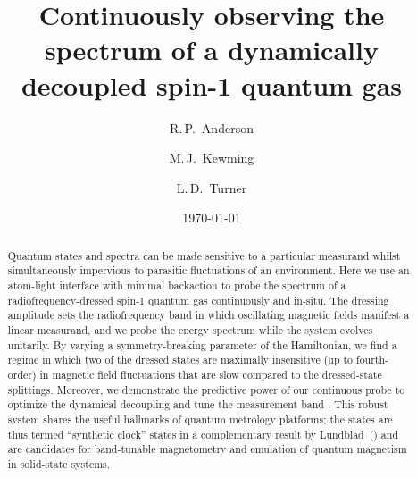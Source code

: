 \documentclass[aps,prl,reprint,superscriptaddress,floatfix]{revtex4-1}
\begin{document}
\title{Continuously observing the spectrum of a dynamically decoupled spin-1 quantum gas}

\author{R.\,P.~Anderson}
\author{M.\,J.~Kewming }
\author{L.\,D.~Turner}

\date{\today}

\begin{abstract}
Quantum states and spectra can be made sensitive to a particular measurand whilst simultaneously impervious to parasitic fluctuations of an environment.
Here we use an atom-light interface with minimal backaction to probe the spectrum of a radiofrequency-dressed spin-1 quantum gas continuously and in-situ.
The dressing amplitude sets the radiofrequency band in which oscillating magnetic fields manifest a linear measurand, and we probe the energy spectrum while the system evolves unitarily.
By varying a symmetry-breaking parameter of the Hamiltonian, we find a regime in which two of the dressed states are maximally insensitive (up to fourth-order) in magnetic field fluctuations that are slow compared to the dressed-state splittings.
Moreover, we demonstrate the predictive power of our continuous probe to optimize the dynamical decoupling and tune the measurement band .
This robust system shares the useful hallmarks of quantum metrology platforms; the states are thus termed ``synthetic clock'' states in a complementary result by Lundblad~\etal (\lundblad) and are candidates for band-tunable magnetometry and emulation of quantum magnetism in solid-state systems. 
\end{abstract}

\maketitle
\end{document}
